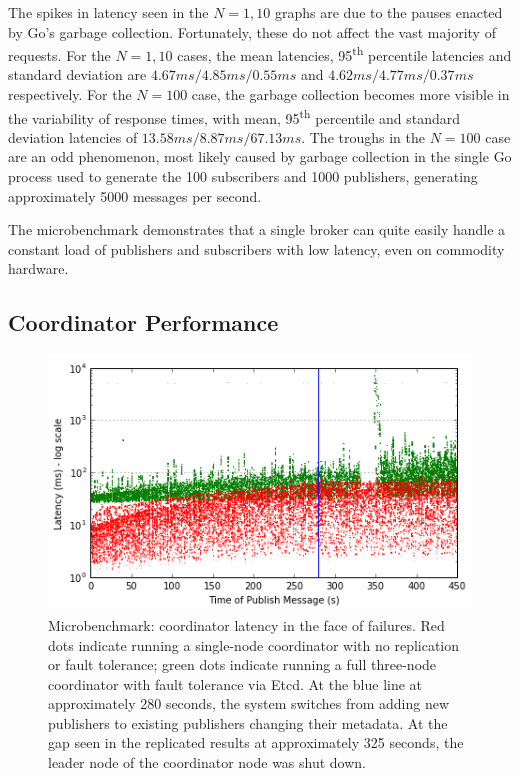The spikes in latency seen in the $N=1,10$ graphs are due to the pauses enacted by Go's garbage collection.
Fortunately, these do not affect the vast majority of requests.
For the $N=1,10$ cases, the mean latencies, 95\textsuperscript{th} percentile latencies and standard deviation are $4.67ms/4.85ms/0.55ms$ and $4.62ms/4.77ms/0.37ms$ respectively.
For the $N=100$ case, the garbage collection becomes more visible in the variability of response times, with mean, 95\textsuperscript{th} percentile and standard deviation latencies of $13.58ms/8.87ms/67.13ms$.
The troughs in the $N=100$ case are an odd phenomenon, most likely caused by garbage collection in the single Go process used to generate the 100 subscribers and 1000 publishers, generating approximately 5000 messages per second.

The microbenchmark demonstrates that a single broker can quite easily handle a constant load of publishers and subscribers with low latency, even on commodity hardware.

\subsection{Coordinator Performance}

\begin{figure}[t]
\centering
\includegraphics[width=\linewidth]{figs/coordinator_performance.png}
\caption{Microbenchmark: coordinator latency in the face of failures.
Red dots indicate running a single-node coordinator with no replication or fault tolerance; green dots indicate running a full three-node coordinator with fault tolerance via Etcd.
At the blue line at approximately 280 seconds, the system switches from adding new publishers to existing publishers changing their metadata.
At the gap seen in the replicated results at approximately 325 seconds, the leader node of the coordinator node was shut down.}
\label{fig:coordinator_performance}
\end{figure}

